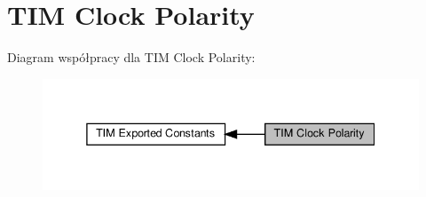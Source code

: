 \hypertarget{group___t_i_m___clock___polarity}{}\section{T\+IM Clock Polarity}
\label{group___t_i_m___clock___polarity}
Diagram współpracy dla T\+IM Clock Polarity\+:\nopagebreak
\begin{figure}[H]
\begin{center}
\leavevmode
\includegraphics[width=338pt]{group___t_i_m___clock___polarity}
\end{center}
\end{figure}
